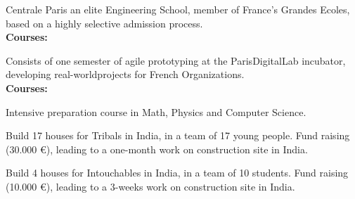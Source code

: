 



\small{Centrale Paris an elite Engineering School, member of France’s Grandes Ecoles, based on a highly selective admission process.\\}
{\textbf{Courses:}} \footnotesize{    }

\divider

\small{Consists of one semester of agile prototyping at the ParisDigitalLab incubator, developing real-worldprojects for French Organizations.\\}%
{\textbf{Courses:}} \footnotesize{  }

\divider

\small{Intensive preparation course in Math, Physics and Computer Science.}

\divider





\small{Build 17 houses for Tribals in India, in a team of 17 young people.
Fund raising (30.000 €), leading to a one-month work on construction site in India.}

\divider


\small{Build 4 houses for Intouchables in India, in a team of 10 students.
Fund raising (10.000 €), leading to a 3-weeks work on construction site in India.}






